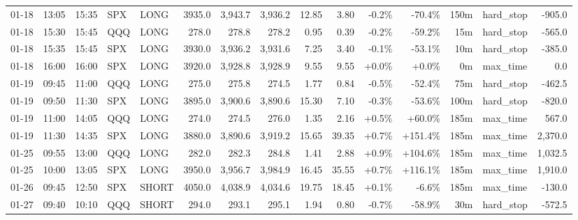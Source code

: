 \documentclass[11pt,a4paper,twoside]{article}
\begin{document}
\begin{landscape}
\begin{center}
\begin{longtable}{>{\color{txtmain}}l l l l l r r r r r r r r >{\color{txtmain}}l r}
01-18 & 13:05 & 15:35 & SPX & LONG & 3935.0 & 3,943.7 & 3,936.2 & 12.85 & 3.80 & \textcolor{lossred}{-0.2\%} & \textcolor{lossred}{-70.4\%} & 150m & hard\_stop & \textcolor{lossred}{-905.0} \\
01-18 & 15:30 & 15:45 & QQQ & LONG & 278.0 & 278.8 & 278.2 & 0.95 & 0.39 & \textcolor{lossred}{-0.2\%} & \textcolor{lossred}{-59.2\%} & 15m & hard\_stop & \textcolor{lossred}{-565.0} \\
01-18 & 15:35 & 15:45 & SPX & LONG & 3930.0 & 3,936.2 & 3,931.6 & 7.25 & 3.40 & \textcolor{lossred}{-0.1\%} & \textcolor{lossred}{-53.1\%} & 10m & hard\_stop & \textcolor{lossred}{-385.0} \\
01-18 & 16:00 & 16:00 & SPX & LONG & 3920.0 & 3,928.8 & 3,928.9 & 9.55 & 9.55 & \textcolor{wingreen}{+0.0\%} & \textcolor{wingreen}{+0.0\%} & 0m & max\_time & \textcolor{wingreen}{0.0} \\
01-19 & 09:45 & 11:00 & QQQ & LONG & 275.0 & 275.8 & 274.5 & 1.77 & 0.84 & \textcolor{lossred}{-0.5\%} & \textcolor{lossred}{-52.4\%} & 75m & hard\_stop & \textcolor{lossred}{-462.5} \\
01-19 & 09:50 & 11:30 & SPX & LONG & 3895.0 & 3,900.6 & 3,890.6 & 15.30 & 7.10 & \textcolor{lossred}{-0.3\%} & \textcolor{lossred}{-53.6\%} & 100m & hard\_stop & \textcolor{lossred}{-820.0} \\
01-19 & 11:00 & 14:05 & QQQ & LONG & 274.0 & 274.5 & 276.0 & 1.35 & 2.16 & \textcolor{wingreen}{+0.5\%} & \textcolor{wingreen}{+60.0\%} & 185m & max\_time & \textcolor{wingreen}{567.0} \\
01-19 & 11:30 & 14:35 & SPX & LONG & 3880.0 & 3,890.6 & 3,919.2 & 15.65 & 39.35 & \textcolor{wingreen}{+0.7\%} & \textcolor{wingreen}{+151.4\%} & 185m & max\_time & \textcolor{wingreen}{2,370.0} \\
01-25 & 09:55 & 13:00 & QQQ & LONG & 282.0 & 282.3 & 284.8 & 1.41 & 2.88 & \textcolor{wingreen}{+0.9\%} & \textcolor{wingreen}{+104.6\%} & 185m & max\_time & \textcolor{wingreen}{1,032.5} \\
01-25 & 10:00 & 13:05 & SPX & LONG & 3950.0 & 3,956.7 & 3,984.9 & 16.45 & 35.55 & \textcolor{wingreen}{+0.7\%} & \textcolor{wingreen}{+116.1\%} & 185m & max\_time & \textcolor{wingreen}{1,910.0} \\
01-26 & 09:45 & 12:50 & SPX & SHORT & 4050.0 & 4,038.9 & 4,034.6 & 19.75 & 18.45 & \textcolor{wingreen}{+0.1\%} & \textcolor{lossred}{-6.6\%} & 185m & max\_time & \textcolor{lossred}{-130.0} \\
01-27 & 09:40 & 10:10 & QQQ & SHORT & 294.0 & 293.1 & 295.1 & 1.94 & 0.80 & \textcolor{lossred}{-0.7\%} & \textcolor{lossred}{-58.9\%} & 30m & hard\_stop & \textcolor{lossred}{-572.5} \\

\end{longtable}
\end{center}
\end{landscape}
\end{document}
